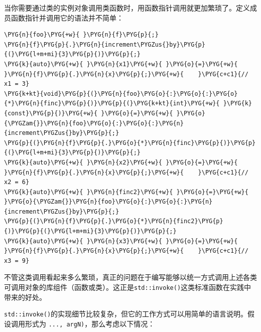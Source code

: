 
当你需要通过类的实例对象调用类函数时，用函数指针调用就更加繁琐了。定义成员函数指针并调用它的语法并不简单：



\begin{codeblockbg}
\begin{Verbatim}[commandchars=\\\{\},breaklines=true,breakanywhere=true,fontsize=\codefont,xleftmargin=17bp]
\PYG{n}{foo}\PYG{+w}{ }\PYG{n}{f}\PYG{p}{;}
\PYG{n}{f}\PYG{p}{.}\PYG{n}{increment\PYGZus{}by}\PYG{p}{(}\PYG{l+m+mi}{3}\PYG{p}{)}\PYG{p}{;}
\PYG{k}{auto}\PYG{+w}{ }\PYG{n}{x1}\PYG{+w}{ }\PYG{o}{=}\PYG{+w}{ }\PYG{n}{f}\PYG{p}{.}\PYG{n}{x}\PYG{p}{;}\PYG{+w}{    }\PYG{c+c1}{// x1 = 3}
\PYG{k+kt}{void}\PYG{p}{(}\PYG{n}{foo}\PYG{o}{:}\PYG{o}{:}\PYG{o}{*}\PYG{n}{finc}\PYG{p}{)}\PYG{p}{(}\PYG{k+kt}{int}\PYG{+w}{ }\PYG{k}{const}\PYG{p}{)}\PYG{+w}{ }\PYG{o}{=}\PYG{+w}{ }\PYG{o}{\PYGZam{}}\PYG{n}{foo}\PYG{o}{:}\PYG{o}{:}\PYG{n}{increment\PYGZus{}by}\PYG{p}{;}
\PYG{p}{(}\PYG{n}{f}\PYG{p}{.}\PYG{o}{*}\PYG{n}{finc}\PYG{p}{)}\PYG{p}{(}\PYG{l+m+mi}{3}\PYG{p}{)}\PYG{p}{;}
\PYG{k}{auto}\PYG{+w}{ }\PYG{n}{x2}\PYG{+w}{ }\PYG{o}{=}\PYG{+w}{ }\PYG{n}{f}\PYG{p}{.}\PYG{n}{x}\PYG{p}{;}\PYG{+w}{    }\PYG{c+c1}{// x2 = 6}
\PYG{k}{auto}\PYG{+w}{ }\PYG{n}{finc2}\PYG{+w}{ }\PYG{o}{=}\PYG{+w}{ }\PYG{o}{\PYGZam{}}\PYG{n}{foo}\PYG{o}{:}\PYG{o}{:}\PYG{n}{increment\PYGZus{}by}\PYG{p}{;}
\PYG{p}{(}\PYG{n}{f}\PYG{p}{.}\PYG{o}{*}\PYG{n}{finc2}\PYG{p}{)}\PYG{p}{(}\PYG{l+m+mi}{3}\PYG{p}{)}\PYG{p}{;}
\PYG{k}{auto}\PYG{+w}{ }\PYG{n}{x3}\PYG{+w}{ }\PYG{o}{=}\PYG{+w}{ }\PYG{n}{f}\PYG{p}{.}\PYG{n}{x}\PYG{p}{;}\PYG{+w}{    }\PYG{c+c1}{// x3 = 9}
\end{Verbatim}
\end{codeblockbg}



不管这类调用看起来多么繁琐，真正的问题在于编写能够以统一方式调用上述各类可调用对象的库组件（函数或类）。这正是\texttt{std::\allowbreak{}invoke()}这类标准函数在实践中带来的好处。



\texttt{std::\allowbreak{}invoke()}的实现细节比较复杂，但它的工作方式可以用简单的语言说明。假设调用形式为 \texttt{...\allowbreak{}, argN)}，那么考虑以下情况：



